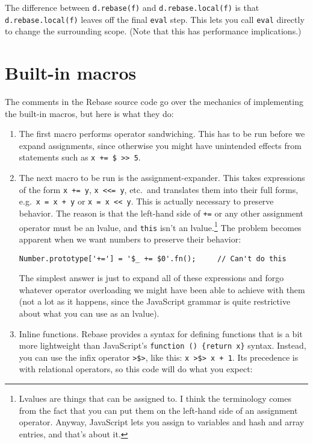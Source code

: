 \documentclass{report}
\begin{document}
    The difference between \verb|d.rebase(f)| and \verb|d.rebase.local(f)| is that \verb|d.rebase.local(f)| leaves off the final \verb|eval| step. This lets you call \verb|eval| directly to
    change the surrounding scope. (Note that this has performance implications.)

\section {Built-in macros}
      \label{sec:builtin-macros}
      The comments in the Rebase source code go over the mechanics of implementing the built-in macros, but here is what they do:

\begin{enumerate}
\item The first macro performs operator sandwiching. This has to be run before we expand assignments, since otherwise you might have unintended effects from statements such as
          \verb|x += $ >> 5|.

\item The next macro to be run is the assignment-expander. This takes expressions of the form \verb|x += y|, \verb|x <<= y|, etc.~and translates them into their full forms,
          e.g.~\verb|x = x + y| or \verb|x = x << y|. This is actually necessary to preserve behavior. The reason is that the left-hand side of \verb|+=| or any other assignment operator must
          be an lvalue, and \verb|this| isn't an lvalue.\footnote{Lvalues are things that can be assigned to. I think the terminology comes from the fact that you can put them on the left-hand
          side of an assignment operator. Anyway, JavaScript lets you assign to variables and hash and array entries, and that's about it.} The problem becomes apparent when we want numbers to
          preserve their behavior:

\begin{verbatim}
Number.prototype['+='] = '$_ += $0'.fn();     // Can't do this
\end{verbatim}

          The simplest answer is just to expand all of these expressions and forgo whatever operator overloading we might have been able to achieve with them (not a lot as it happens, since
          the JavaScript grammar is quite restrictive about what you can use as an lvalue).

\item Inline functions. Rebase provides a syntax for defining functions that is a bit more lightweight than JavaScript's \verb|function () {return x}| syntax. Instead, you can use the
          infix operator \verb|>$>|, like this: \verb|x >$> x + 1|. Its precedence is with relational operators, so this code will do what you expect:


\end{enumerate}
\end{document}
